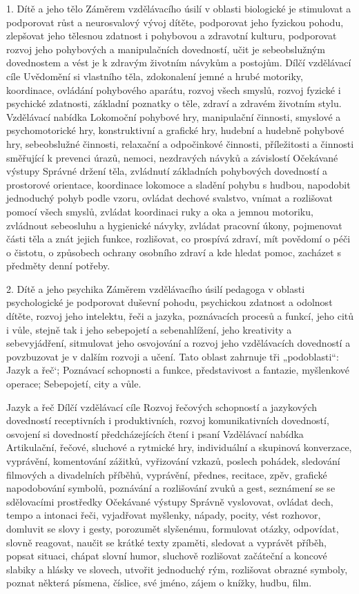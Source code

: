 	1. Dítě a jeho tělo
	Záměrem vzdělávacího úsilí v oblasti biologické je stimulovat a podporovat růst a neurosvalový vývoj dítěte, podporovat jeho fyzickou pohodu, zlepšovat jeho tělesnou zdatnost i pohybovou a zdravotní kulturu, podporovat rozvoj jeho pohybových a manipulačních dovedností, učit je sebeobslužným dovednostem a vést je k zdravým životním návykům a postojům.
	Dílčí vzdělávací cíle 
	Uvědomění si vlastního těla, zdokonalení jemné a hrubé motoriky, koordinace, ovládání pohybového aparátu, rozvoj všech smyslů, rozvoj fyzické i psychické zdatnosti, základní poznatky o těle, zdraví a zdravém životním stylu.
	Vzdělávací nabídka
	Lokomoční pohybové hry, manipulační činnosti, smyslové a psychomotorické hry, konstruktivní a grafické hry, hudební a hudebně pohybové hry, sebeobslužné činnosti, relaxační a odpočinkové činnosti, příležitosti a činnosti směřující k prevenci úrazů, nemoci, nezdravých návyků a závislostí
	Očekávané výstupy
	Správné držení těla, zvládnutí základních pohybových dovedností a prostorové orientace, koordinace lokomoce a sladění pohybu s hudbou, napodobit jednoduchý pohyb podle vzoru, ovládat dechové svalstvo, vnímat a rozlišovat pomocí všech smyslů, zvládat koordinaci ruky a oka a jemnou motoriku, zvládnout sebeosluhu a hygienické návyky, zvládat pracovní úkony, pojmenovat části těla a znát jejich funkce, rozlišovat, co prospívá zdraví, mít povědomí o péči o čistotu, o způsobech ochrany osobního zdraví a kde hledat pomoc, zacházet s předměty denní potřeby.

	2. Dítě a jeho psychika
	Záměrem vzdělávacího úsilí pedagoga v oblasti psychologické je podporovat duševní pohodu, psychickou zdatnost a odolnost dítěte, rozvoj jeho intelektu, řeči a jazyka, poznávacích procesů a funkcí, jeho citů i vůle, stejně tak i jeho sebepojetí a sebenahlížení, jeho kreativity a sebevyjádření, sitmulovat jeho osvojování a rozvoj jeho vzdělávacích dovedností a povzbuzovat je v dalším rozvoji a učení.
	Tato oblast zahrnuje tři „podoblasti“: Jazyk a řeč‘; Poznávací schopnosti a funkce, představivost a fantazie, myšlenkové operace; Sebepojetí, city a vůle.

	Jazyk a řeč
	Dílčí vzdělávací cíle
	Rozvoj řečových schopností a jazykových dovedností receptivních i produktivních, rozvoj komunikativních dovedností, osvojení si dovedností předcházejících čtení i psaní
	Vzdělávací nabídka
	Artikulační, řečové, sluchové a rytmické hry, individuální a skupinová konverzace, vyprávění, komentování zážitků, vyřizování vzkazů, poslech pohádek, sledování filmových a divadelních příběhů, vyprávění, přednes, recitace, zpěv, grafické napodobování symbolů, poznávání a rozlišování zvuků a gest, seznámení se se sdělovacími prostředky
	Očekávané výstupy
	Správně vyslovovat, ovládat dech, tempo a intonaci řeči, vyjadřovat myšlenky, nápady, pocity, vést rozhovor, domluvit se slovy i gesty, porozumět slyšenému, formulovat otázky, odpovídat, slovně reagovat, naučit se krátké texty zpaměti, sledovat a vyprávět příběh, popsat situaci, chápat slovní humor, sluchově rozlišovat začáteční a koncové slabiky a hlásky ve slovech, utvořit jednoduchý rým, rozlišovat obrazné symboly, poznat některá písmena, číslice, své jméno, zájem o knížky, hudbu, film.

